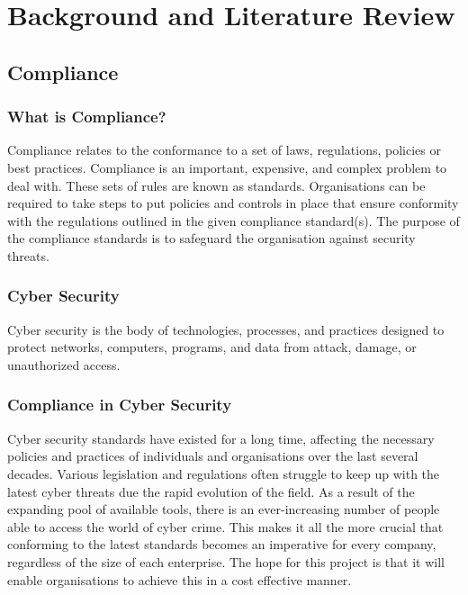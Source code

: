 \chapter{Background and Literature Review} \label{Chapter:two}


\section{Compliance}

    \subsection{What is Compliance?}
        Compliance relates to the conformance to a set of laws, regulations, policies or best practices. Compliance is an important, expensive, and complex problem to deal with. \cite{ComplianceGovernance} These sets of rules are known as standards. Organisations can be required to take steps to put policies and controls in place that ensure conformity with the regulations outlined in the given compliance standard(s). The purpose of the compliance standards is to safeguard the organisation against security threats.

    \subsection{Cyber Security}
        Cyber security is the body of technologies, processes, and practices designed to protect networks, computers, programs, and data from attack, damage, or unauthorized access. \cite{CSCRM}

    \subsection{Compliance in Cyber Security}
        Cyber security standards have existed for a long time, affecting the necessary policies and practices of individuals and organisations over the last several decades. \cite{StanfordConsortium} Various legislation and regulations often struggle to keep up with the latest cyber threats due the rapid evolution of the field. \cite{GDPR} As a result of the expanding pool of available tools, there is an ever-increasing number of people able to access the world of cyber crime. This makes it all the more crucial that conforming to the latest standards becomes an imperative for every company, regardless of the size of each enterprise. The hope for this project is that it will enable organisations to achieve this in a cost effective manner.


